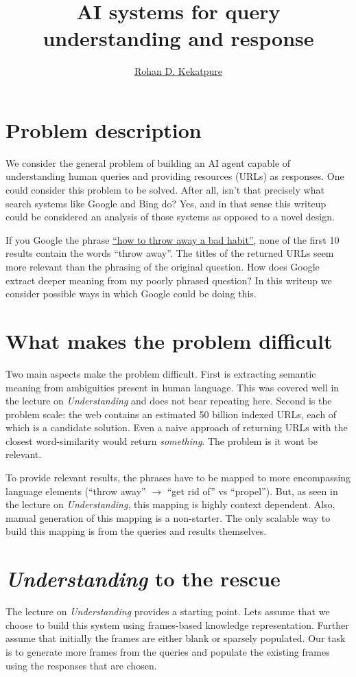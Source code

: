 \documentclass[10pt,letterpaper]{article}
\begin{document}
\title{\large{AI systems for query understanding and response}}
\author{\href{mailto:rohan.kekatpure@gmail.com}{Rohan D. Kekatpure}}
\section{Problem description}
We consider the general problem of building an AI agent capable of understanding human queries and providing resources (URLs) as responses. One could consider this problem to be solved. After all, isn't that precisely what search systems like Google and Bing do? Yes, and in that sense this writeup could be considered an analysis of those systems as opposed to a novel design.

If you Google the phrase \href{https://goo.gl/IRRxB1}{``how to throw away a bad habit''}, none of the first 10 results contain the words ``throw away''. The titles of the returned URLs seem more relevant than the phrasing of the original question. How does Google extract deeper meaning from my poorly phrased question? In this writeup we consider possible ways in which Google could be doing this.

\section{What makes the problem difficult}
Two main aspects make the problem difficult. First is extracting semantic meaning from ambiguities present in human language. This was covered well in the lecture on {\em Understanding} and does not bear repeating here. Second is the problem scale: the web contains an estimated 50 billion indexed URLs, each of which is a candidate solution. Even a naive approach of returning URLs with the closest word-similarity would return {\em something}. The problem is it wont be relevant. 

To provide relevant results, the phrases have to be mapped to more encompassing language elements (``throw away'' $\to$ ``get rid of'' vs ``propel''). But, as seen in the lecture on {\em Understanding}, this mapping is highly context dependent. Also, manual generation of this mapping is a non-starter. The only scalable way to  build this mapping is from the queries and results themselves. 

\section{{\em Understanding} to the rescue}
The lecture on {\em Understanding} provides a starting point. Lets assume that we choose to build this system using frames-based knowledge representation. Further assume that initially the frames are either blank or sparsely populated. Our task is to generate more frames from the queries and populate the existing frames using the responses that are chosen.
\end{document}
